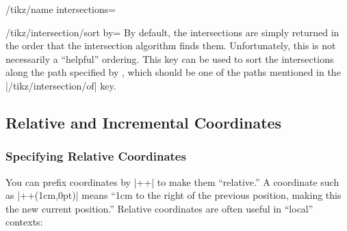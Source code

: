 \begin{key}{/tikz/name intersections=}
  \begin{key}{/tikz/intersection/sort by=}
By default, the intersections are simply returned in the order that
the intersection algorithm finds them. Unfortunately, this is not
necessarily a ``helpful'' ordering. This key can be used to sort
the intersections along the path specified by ,
which should be one of the paths mentioned in the
|/tikz/intersection/of| key.

\begin{codeexample}[]
\end{codeexample}

  \end{key}
\end{key}




\subsection{Relative and Incremental Coordinates}


\subsubsection{Specifying Relative Coordinates}

You can prefix coordinates by |++| to make them ``relative.'' A
coordinate such as |++(1cm,0pt)| means ``1cm to the right of the
previous position, making this the new current position.'' Relative
coordinates are often useful in ``local'' contexts:

\begin{codeexample}[]
\end{codeexample}

